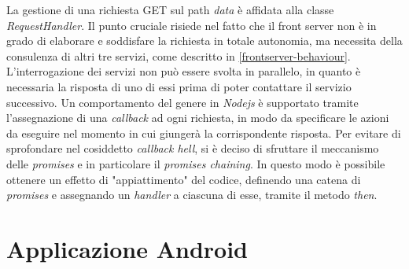 \documentclass[a4paper,12pt]{report}
\begin{document}
La gestione di una richiesta GET sul path \emph{data} è affidata alla classe \emph{RequestHandler}. Il punto cruciale risiede nel fatto che il front server non è in grado di elaborare e soddisfare la richiesta in totale autonomia, ma necessita della consulenza di altri tre servizi, come descritto in \autoref{frontserver-behaviour}. L'interrogazione dei servizi non può essere svolta in parallelo, in quanto è necessaria la risposta di uno di essi prima di poter contattare il servizio successivo. Un comportamento del genere in \emph{Nodejs} è supportato tramite l'assegnazione di una \emph{callback} ad ogni richiesta, in modo da specificare le azioni da eseguire nel momento in cui giungerà la corrispondente risposta. Per evitare di sprofondare nel cosiddetto \emph{callback hell}, si è deciso di sfruttare il meccanismo delle \emph{promises} e in particolare il \emph{promises chaining}. In questo modo è possibile ottenere un effetto di "appiattimento" del codice, definendo una catena di \emph{promises} e assegnando un \emph{handler} a ciascuna di esse, tramite il metodo \emph{then}.


\section{Applicazione Android}
\end{document}
